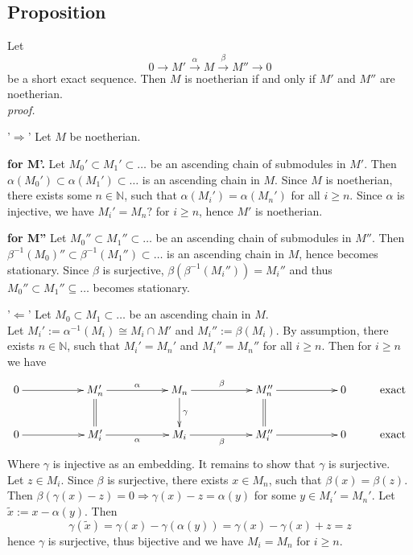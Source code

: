 \documentclass[12pt]{book}
\begin{document}
\begin{spacing}{1.3}
\subsection{Proposition} %
Let 
$$ 0 \longrightarrow M' \overset{\alpha}{\longrightarrow} M \overset{\beta}{\longrightarrow} M'' \longrightarrow 0$$
be a short exact sequence. Then $M$ is noetherian if and only if $M'$ and $M''$ are noetherian.\\
\textit{proof.}
\begin{compactitem}
\item['$\Rightarrow$']Let $M$ be noetherian.
\begin{compactitem}
\item[\textbf{for M'.}] Let $M_0' \subset M_1' \subset \ldots $ be an ascending chain of submodules in $M'$. Then \linebreak $\alpha(M_0') \subset \alpha(M_1') \subset \ldots $ is an ascending chain in $M$. Since $M$ is noetherian, there exists some $n \in \mathbb{N}$, such that $\alpha(M_i')=\alpha(M_n')$ for all $i \geqslant n$. Since $\alpha$ is injective, we have $M_i'=M_n?$ for $i \geqslant n$, hence $M'$ is noetherian.
\item[\textbf{for M''}] Let $M_0'' \subset M_1'' \subset \ldots$ be an ascending chain of submodules in $M''$. Then  \linebreak  $\beta^{-1}(M_0)'' \subset \beta^{-1}(M_1'') \subset \ldots$ is an ascending chain in $M$, hence becomes stationary. Since $\beta$ is surjective, $\beta\left(\beta^{-1}(M_i'')\right)=M_i''$ and thus $M_0'' \subset M_1'' \subseteq \ldots $ becomes stationary.
\end{compactitem}
\item['$\Leftarrow$'] Let $M_0 \subset M_1 \subset \ldots $ be an ascending chain in $M$.\\
Let $M_i':= \alpha^{-1}(M_i) \cong M_i \cap M'$ and $M_i'' := \beta(M_i)$. By assumption, there exists $n \in \mathbb{N}$, such that $M_i'=M_n'$ and $M_i'' = M_n''$ for all $i \geqslant n$. Then for $i \geqslant n$ we have
$$\begin{xy}
\xymatrix{
0 \ar[rr] && M_n' \ar[rr]^{\alpha} \ar@2{-}[d] && M_n \ar[rr]^{\beta} \ar[d]^{\gamma} && M_n'' \ar[rr] \ar@2{-}[d] && 0 &  \textrm{exact} \\ 0 \ar[rr] && M_i' \ar[rr]_{\alpha} && M_i \ar[rr]_{\beta} && M_i'' \ar[rr] && 0 & \textrm{exact}
}
\end{xy}$$
Where $\gamma$ is injective as an embedding. It remains to show that $\gamma$ is surjective.\\
Let $z \in M_i$. Since $\beta$ is surjective, there exists $x \in M_n$, such that $\beta(x)=\beta(z)$.\\
Then $\beta\left(\gamma(x)-z\right)=0 \Rightarrow \gamma(x)-z = \alpha(y)$ for some $y \in M_i'=M_n'$. Let $\tilde{x}:=x - \alpha(y)$. Then
$$\gamma(\tilde{x})= \gamma(x)- \gamma\left(\alpha(y)\right)=\gamma(x)-\gamma(x)+z=z$$
hence $\gamma$ is surjective, thus bijective and we have $M_i=M_n$ for $i \geqslant n$. 
\end{compactitem}


\end{spacing}
\end{document}
